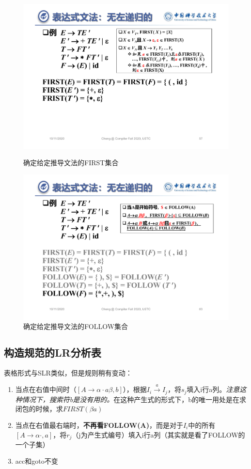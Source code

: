 \documentclass[]{report}
\begin{document}
		\begin{figure}[h!]
			\centering
			\begin{minipage}{20em}
				\centering
				\includegraphics[scale = 0.2]{images/LL1_first.pdf}
				\caption{确定给定推导文法的FIRST集合}
			\end{minipage}
			\begin{minipage}{20em}
				\centering
				\includegraphics[scale = 0.2]{images/LL1_follow.pdf}
				\caption{确定给定推导文法的FOLLOW集合}
			\end{minipage}
		\end{figure}
		\subsection{构造规范的LR分析表}
		表格形式与SLR类似，但是规则稍有变动：
		\begin{enumerate}
			\item 当点在右值中间时（$[A\to\alpha\cdot a\beta,b]$），根据$I_i\stackrel{a}{\to}I_j$，将$s_j$填入i行a列。\textit{注意这种情况下，搜索符b是没有用的。}在这种产生式的形式下，b的唯一用处是在求闭包的时候，求$FIRST(\beta a)$
			\item 当点在右值最右端时，\textbf{不再看FOLLOW(A)}，而是对于$I_i$中的所有$[A\to\alpha\cdot,a]$，将$r_j$（j为产生式编号）填入i行a列（其实就是看了FOLLOW的一个子集）
			\item acc和goto不变
		\end{enumerate}
\end{document}
